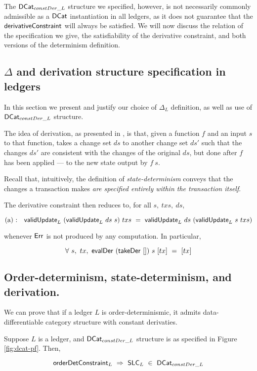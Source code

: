 The $\mathsf{DCat}_{constDer\_L}$ structure we specified, however, is not necessarily
commonly admissible as a $\mathsf{DCat}$ instantiation in all ledgers,
as it does not guarantee that the $\mathsf{derivativeConstraint}$ will always be satisfied.
We will now discuss the relation of the specification we give, the satisfiability of
the derivative constraint, and both versions of the determinism definition.

\subsection{$\Delta$ and derivation structure specification in ledgers}

In this section we present and justify our choice of $\Delta_L$ definition, as well
as use of $\mathsf{DCat}_{constDer\_L}$ structure.

The idea of derivation, as presented in \cite{changes}, is that,
given a function $f$ and an input $s$ to that function, takes a change set $ds$ to another change set $ds'$
such that the changes $ds'$ are consistent with the changes of the original $ds$,
but done after $f$ has been applied --- to the new state output by $f~s$.

Recall that, intuitively, the definition of \emph{state-determinism} conveys that the changes
a transaction makes \emph{are specified entirely within the transaction itself}.


The derivative constraint then reduces to, for all $s,~txs,~ds$,

\[\text{(a)~:~~~} \mathsf{validUpdate}_L~ (\mathsf{validUpdate}_L~ ds~ s) ~txs~=~\mathsf{validUpdate}_L ~ds~(\mathsf{validUpdate}_L~ s ~txs) \]

whenever $\mathsf{Err}$ is not produced by any computation. In particular,

\[ \forall~s,~tx,~\mathsf{evalDer} ~(\mathsf{takeDer}~ []) ~s~ [tx] ~=~[tx] \]


\subsection{Order-determinism, state-determinism, and derivation.~}
\label{sec:od-sd-d}
We can prove that if a ledger $L$ is order-determinismic, it admits data-differentiable
category structure with constant derivaties.

\begin{theorem}
  Suppose $L$ is a ledger, and $\mathsf{DCat}_{constDer\_L}$ structure is as specified in Figure \ref{fig:dcat-pf}.
  Then,

  \[ \mathsf{orderDetConstraint}_L ~\Rightarrow~\mathsf{SLC}_L~\in~\mathsf{DCat}_{constDer\_L} \]

  \label{theo:dcat-pf}
\end{theorem}

